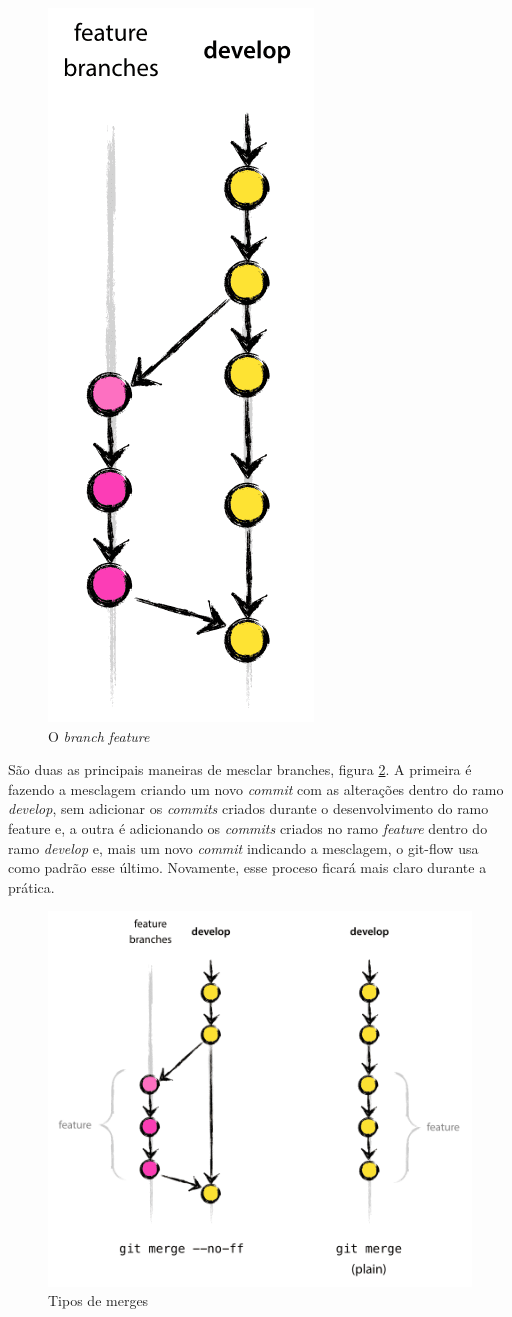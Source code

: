 \documentclass[12pt,openright,oneside,a4paper,english,brazil]{abntex2}
\begin{document}
\begin{figure}[h]
	\caption{\label{feature}O \textit{branch} \textit{feature}}
	\begin{center}
		\includegraphics[width=0.26\linewidth]{feature}
	\end{center}
\end{figure}


São duas as principais maneiras de mesclar branches, figura \ref{feature-merges}. A primeira é fazendo a mesclagem criando um novo \textit{commit} com as alterações dentro do ramo \textit{develop}, sem adicionar os \textit{commits} criados durante o desenvolvimento do ramo feature e, a outra é adicionando os \textit{commits} criados no ramo \textit{feature} dentro do ramo \textit{develop} e, mais um novo \textit{commit} indicando a mesclagem, o git-flow usa como padrão esse último. Novamente, esse proceso ficará mais claro durante a prática.


\begin{figure}[h]
	\caption{\label{feature-merges}Tipos de merges}
	\begin{center}
		\includegraphics[width=0.8\linewidth]{feature-merges}
	\end{center}
\end{figure}
\end{document}
